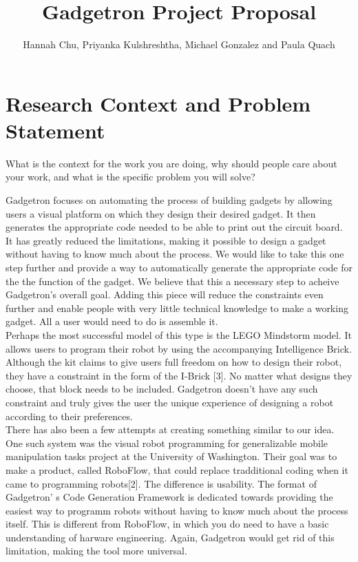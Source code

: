 \documentclass[12pt]{article}
\begin{document}
\author{Hannah Chu, Priyanka Kulshreshtha, Michael Gonzalez and Paula Quach}
\title{Gadgetron Project Proposal}
\maketitle

\section{Research Context and Problem Statement}
    What is the context for the work you are doing, why should people care about your work, and what is the specific problem you will solve?
    
    Gadgetron focuses on automating the process of building gadgets by allowing users a visual platform on which they 
	design their desired gadget. It then generates the appropriate code needed to be able to print out the circuit board.  
 	It has greatly reduced the limitations, making it possible to design a gadget without having to know much about
	the process. We would like to take this one step further and provide a way to automatically generate the appropriate
	code for the the function of the gadget. We believe that this a necessary step to acheive Gadgetron's overall goal. 			Adding this piece will reduce the constraints even further and enable people with very little technical knowledge 
	to make a working gadget. All a user would need to do is assemble it.\\[7pt]
	Perhaps the most successful model of this type is the LEGO Mindstorm model. It allows users to program their
	robot by using the accompanying Intelligence Brick. Although the kit claims to give users full freedom on how to 
	design their robot, they have a constraint in the form of the I-Brick [3]. No matter what designs they choose, that 
	block needs to be included. Gadgetron doesn't have any such constraint and truly gives the user the unique 
	experience of designing a robot according to their preferences.\\[7pt]
	There has also been a few attempts at creating something similar to our idea. One such system was the visual
	robot programming for generalizable mobile manipulation tasks project at the University of Washington. Their goal 
	was to make a product, called RoboFlow, that could replace tradditional coding when it came to programming
	robots[2]. The difference is usability. The format of Gadgetron' s Code Generation Framework is dedicated towards
	providing the easiest way to programm robots without having to know much about the process itself. This is 
	different from RoboFlow, in which you do need to have a basic understanding of harware engineering. Again, 
	Gadgetron would get rid of this limitation, making the tool more universal.
\end{document}

